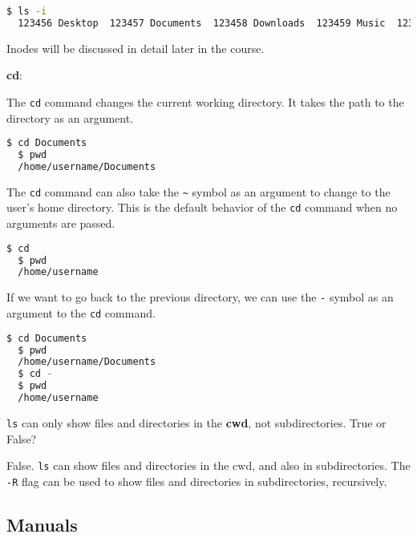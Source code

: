 \begin{lstlisting}[language=bash]
  $ ls -i
  123456 Desktop  123457 Documents  123458 Downloads  123459 Music  123460 Pictures  123461 Videos
\end{lstlisting}

Inodes will be discussed in detail later in the course.

\textbf{cd}:

The \lstinline|cd| command changes the current working directory. It takes the path to the directory as an argument.

\begin{lstlisting}[language=bash]
  $ cd Documents
  $ pwd
  /home/username/Documents
\end{lstlisting}

The \lstinline|cd| command can also take the \lstinline|~| symbol as an argument to change to the user's home directory.
This is the default behavior of the \lstinline|cd| command when no arguments are passed.

\begin{lstlisting}[language=bash]
  $ cd
  $ pwd
  /home/username
\end{lstlisting}

If we want to go back to the previous directory, we can use the \lstinline|-| symbol as an argument to the \lstinline|cd| command.

\begin{lstlisting}[language=bash]
  $ cd Documents
  $ pwd
  /home/username/Documents
  $ cd -
  $ pwd
  /home/username
\end{lstlisting}


\begin{qs}
  \lstinline|ls| can only show files and directories in the \textbf{cwd}, not subdirectories.
  True or False?
\end{qs}

\begin{ans}
  False. \lstinline|ls| can show files and directories in the cwd, and also in subdirectories.
  The \lstinline|-R| flag can be used to show files and directories in subdirectories, recursively.
\end{ans}


\subsection{Manuals}

